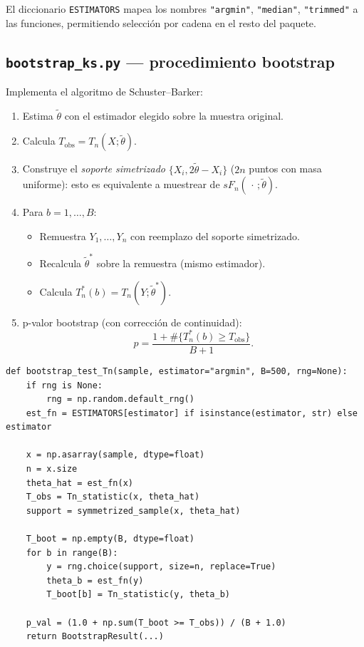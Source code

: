 \documentclass[11pt,a4paper]{article}
\begin{document}
El diccionario \texttt{ESTIMATORS} mapea los nombres \texttt{"argmin"}, \texttt{"median"}, \texttt{"trimmed"} a las funciones, permitiendo selección por cadena en el resto del paquete.

\subsection{\texttt{bootstrap\_ks.py} --- procedimiento bootstrap}

Implementa el algoritmo de Schuster--Barker:
\begin{enumerate}[leftmargin=*]
    \item Estima $\tilde\theta$ con el estimador elegido sobre la muestra original.
    \item Calcula $T_{\text{obs}} = T_n(X; \tilde\theta)$.
    \item Construye el \emph{soporte simetrizado} $\{X_i, 2\tilde\theta - X_i\}$ ($2n$ puntos con masa uniforme): esto es equivalente a muestrear de $sF_n(\,\cdot\,;\tilde\theta)$.
    \item Para $b = 1,\dots,B$:
    \begin{itemize}
        \item Remuestra $Y_1,\dots,Y_n$ con reemplazo del soporte simetrizado.
        \item Recalcula $\tilde\theta^*$ sobre la remuestra (mismo estimador).
        \item Calcula $T_n^*(b) = T_n(Y; \tilde\theta^*)$.
    \end{itemize}
    \item p-valor bootstrap (con corrección de continuidad):
    \[
      p = \frac{1 + \#\{T_n^*(b) \geq T_{\text{obs}}\}}{B+1}.
    \]
\end{enumerate}

\begin{lstlisting}[style=pystyle, caption={Núcleo del bootstrap simétrico}]
def bootstrap_test_Tn(sample, estimator="argmin", B=500, rng=None):
    if rng is None:
        rng = np.random.default_rng()
    est_fn = ESTIMATORS[estimator] if isinstance(estimator, str) else estimator

    x = np.asarray(sample, dtype=float)
    n = x.size
    theta_hat = est_fn(x)
    T_obs = Tn_statistic(x, theta_hat)
    support = symmetrized_sample(x, theta_hat)

    T_boot = np.empty(B, dtype=float)
    for b in range(B):
        y = rng.choice(support, size=n, replace=True)
        theta_b = est_fn(y)
        T_boot[b] = Tn_statistic(y, theta_b)

    p_val = (1.0 + np.sum(T_boot >= T_obs)) / (B + 1.0)
    return BootstrapResult(...)
\end{lstlisting}
\end{document}
